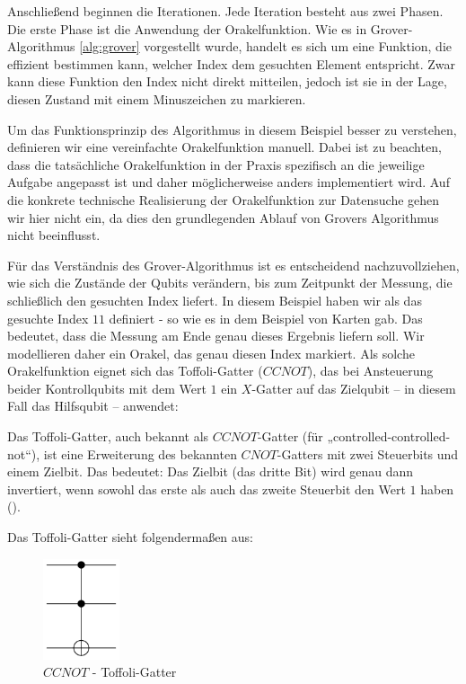 Anschließend beginnen die Iterationen. Jede Iteration besteht aus zwei Phasen. Die erste Phase ist die Anwendung der Orakelfunktion. Wie es in Grover-Algorithmus \ref{alg:grover} vorgestellt wurde, handelt es sich um eine Funktion, die effizient bestimmen kann, welcher Index dem gesuchten Element entspricht. Zwar kann diese Funktion den Index nicht direkt mitteilen, jedoch ist sie in der Lage, diesen Zustand mit einem Minuszeichen zu markieren.

Um das Funktionsprinzip des Algorithmus in diesem Beispiel besser zu verstehen, definieren wir eine vereinfachte Orakelfunktion manuell. Dabei ist zu beachten, dass die tatsächliche Orakelfunktion in der Praxis spezifisch an die jeweilige Aufgabe angepasst ist und daher möglicherweise anders implementiert wird. Auf die konkrete technische Realisierung der Orakelfunktion zur Datensuche gehen wir hier nicht ein, da dies den grundlegenden Ablauf von Grovers Algorithmus nicht beeinflusst.

Für das Verständnis des Grover-Algorithmus ist es entscheidend nachzuvollziehen, wie sich die Zustände der Qubits verändern, bis zum Zeitpunkt der Messung, die schließlich den gesuchten Index liefert. In diesem Beispiel haben wir als das gesuchte Index $11$ definiert - so wie es in dem Beispiel von Karten gab. Das bedeutet, dass die Messung am Ende genau dieses Ergebnis liefern soll. Wir modellieren daher ein Orakel, das genau diesen Index markiert. Als solche Orakelfunktion eignet sich das Toffoli-Gatter ($CCNOT$), das bei Ansteuerung beider Kontrollqubits mit dem Wert $1$ ein $X$-Gatter auf das Zielqubit – in diesem Fall das Hilfsqubit – anwendet:

\begin{definition}
\label{def:toffoli}
Das Toffoli-Gatter, auch bekannt als $CCNOT$-Gatter (für „controlled-controlled-not“), ist eine Erweiterung des bekannten $CNOT$-Gatters mit zwei Steuerbits und einem Zielbit. Das bedeutet: Das Zielbit (das dritte Bit) wird genau dann invertiert, wenn sowohl das erste als auch das zweite Steuerbit den Wert $1$ haben (\cite{toffoli_proceedings_1980}).
\end{definition}

Das Toffoli-Gatter sieht folgendermaßen aus:
\begin{figure}[H]
    \centering
    \includegraphics[width=0.2\textwidth]{images/basic-algorithms/toffoli.png}
    \caption{$CCNOT$ - Toffoli-Gatter}
    \label{fig:toffoli-gate}
\end{figure}

